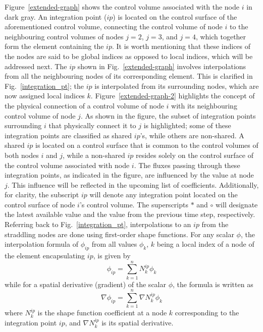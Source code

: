 \documentclass[12pt]{extarticle}
\newcommand{\<}{\langle}
\renewcommand{\>}{\rangle}
\theoremstyle{definition}
\begin{document}
Figure~\ref{extended-graph} shows the control volume associated with the node $i$ in dark gray. An integration point ($ip$) is located on the control surface of the aforementioned control volume, connecting the control volume of node $i$ to the neighbouring control volumes of nodes $j=2$, $j=3$, and $j=4$, which together form the element containing the $ip$. It is worth mentioning that these indices of the nodes are said to be global indices as opposed to local indices, which will be addressed next. The $ip$ shown in Fig.~\ref{extended-graph} involves interpolations from all the neighbouring nodes of its corresponding element. This is clarified in Fig.~\ref{integration_pt}; the $ip$ is interpolated from its surrounding nodes, which are now assigned local indices $k$. Figure~\ref{extended-graph-2} highlights the concept of the physical connection of a control volume of node $i$ with its neighbouring control volume of node $j$. As shown in the figure, the subset of integration points surrounding $i$ that physically connect it to $j$ is highlighted; some of these integration points are classified as shared $ip$'s, while others are non-shared. A shared $ip$ is located on a control surface that is common to the control volumes of both nodes $i$ and $j$, while a non-shared $ip$ resides solely on the control surface of the control volume associated with node $i$. The fluxes passing through these integration points, as indicated in the figure, are influenced by the value at node $j$. This influence will be reflected in the upcoming list of coefficients. Additionally, for clarity, the subscript $ip$ will denote any integration point located on the control surface of node $i$'s control volume. The superscripts $*$ and $\circ$ will designate the latest available value and the value from the previous time step, respectively. Referring back to Fig.~\ref{integration_pt}, interpolations to an $ip$ from the straddling nodes are done using first-order shape functions. For any scalar $\phi$, the interpolation formula of $\phi_{ip}$ from all values $\phi_k$, $k$ being a local index of a node of the element encapsulating $ip$, is given by
\begin{equation}\label{ip_formula}
    \phi_{ip} = \sum_{k=1}^n N_k^{ip} \phi_k
\end{equation}
while for a spatial derivative (gradient) of the scalar $\phi$, the formula is written as
\begin{equation}
    \nabla \phi_{ip} = \sum_{k=1}^n \nabla N_k^{ip} \phi_k
\end{equation}
where $N_k^{ip}$ is the shape function coefficient at a node $k$ corresponding to the integration point $ip$, and $\nabla N_k^{ip}$ is its spatial derivative.
\end{document}
